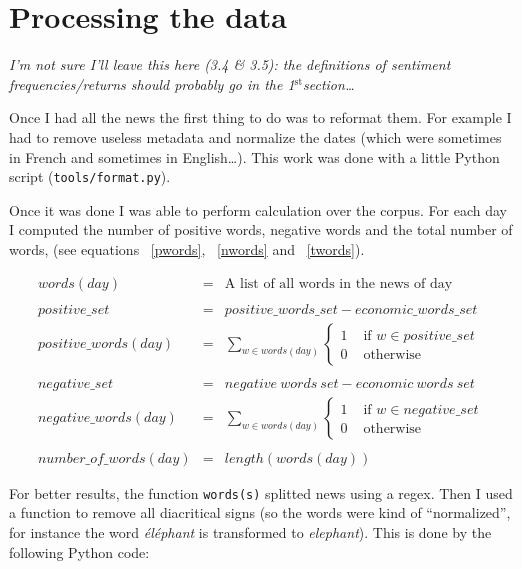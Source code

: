 \documentclass[12pt]{report}
\newcommand{\superscript}[1]{\ensuremath{^{\textrm{#1}}}}
\newcommand{\st}[0]{\superscript{st}}
\begin{document}
\section{Processing the data}

\emph{\color{red}I'm not sure I'll leave this here (3.4 \& 3.5): the definitions of sentiment frequencies/returns should probably go in the 1\st section\ldots}

Once I had all the news the first thing to do was to reformat them. For example I had to remove useless metadata and normalize the dates (which were sometimes in French and sometimes in English\ldots). This work was done with a little Python script (\lstinline!tools/format.py!).

Once it was done I was able to perform calculation over the corpus. For each day I computed the number of positive words, negative words and the total number of words, (see equations ~\ref{pwords}, ~\ref{nwords} and ~\ref{twords}).

\begin{eqnarray}
	words(day) &=& \textrm{A list of all words in the news of day}\nonumber\\
	\nonumber\\
	positive\_set &=& positive\_words\_set - economic\_words\_set\nonumber\\
   positive\_words(day) &=& \sum_{w \in words(day)} \begin{cases}1 & \textrm{ if }w \in positive\_set\\ 0 & \mbox{ otherwise }\end{cases}\label{pwords}\\
	\nonumber\\
	negative\_set &=& negative\ words\ set - economic\ words\ set\nonumber\\
   negative\_words(day) &=& \sum_{w \in words(day)} \begin{cases}1 & \textrm{ if }w \in negative\_set\\ 0 & \mbox{ otherwise }\end{cases}\label{nwords}\\
	\nonumber\\
	number\_of\_words(day) &=& length(words(day))\label{twords}
\end{eqnarray}

For better results, the function \lstinline!words(s)! splitted news using a regex. Then I used a function to remove all diacritical signs (so the words were kind of ``normalized'', for instance the word \emph{éléphant} is transformed to \emph{elephant}). This is done by the following Python code:
\end{document}
